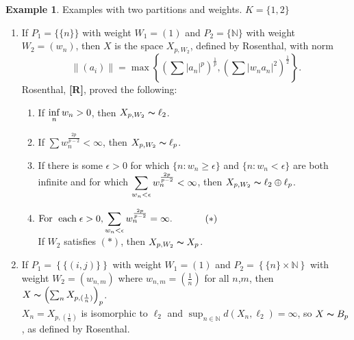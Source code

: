 \documentclass[12pt]{amsart}
\theoremstyle{definition}
\newtheorem{example}[theorem]{Example}
\theoremstyle{remark}
\numberwithin{equation}{section}
\begin{document}
\begin{example}\label{R-space}
 Examples with two partitions and weights.
 $K=\{1,2\}$
  \begin{enumerate}
    \item If $P_1=\big\{ \{n\} \big\}$ with weight $W_1=(1)$ and
 $P_2=\{{\mathbb{N}}\}$ with weight $W_2=(w_n)$, then $X$ is the
 space $X_{p, W_2}$, defined by Rosenthal, with norm
 $$\| (a_i)\|=\max \left\{ \left(\sum |a_n|^p\right)^{\frac{1}{p}}, 
\left(\sum |w_na_n|^2\right)^{\frac{1}{2}}\right\}.$$
  Rosenthal, {\bf{[R]}}, 
proved the following:
          \begin{enumerate}
          \item If $\begin{displaystyle}\inf_n w_n > 0
 \end{displaystyle}$,
 then $X_{p,W_2}\thicksim \ell_2$.
          \item If $\sum w_{n}^{\frac{2p}{p-2}} < \infty$,
 then $X_{p,W_2}\thicksim \ell_p$.
          \item If there is some $\epsilon >0 $ for which
 $\{n: w_n \ge \epsilon\}$ and
  $\{n: w_n < \epsilon\}$ are both infinite and for which
 $\begin{displaystyle}\sum_{w_n <\epsilon} w_{n}^{\frac{2p}{p-2}} < 
\infty\end{displaystyle}$,
 then $X_{p,W_2} \thicksim \ell_2 \oplus \ell_p$.
          \item $\text{For}\;\text{ each}\;\epsilon > 0, 
\begin{displaystyle}\sum_{w_n< \epsilon}
  w_{n}^{\frac{2p}{p-2}}=\infty.\end{displaystyle}\phantom{xxxxxx}(*)$\\
If $W_2$ satisfies $(*)$, then $X_{p,W_2} \thicksim X_p$.
          \end{enumerate}

   
     \item  If $P_1=\left\{ \{(i,j)\} \right\}$ with weight $W_1=(1)$
 and
 $P_2=\left\{ \{n\}\times\mathbb{N}\right\}$ with weight
 $W_2=(w_{n,m})$ where
 $w_{n,m}=\left(\frac{1}{n}\right)$ 
for all $n$,$m$, 
 then $X\thicksim \left(\sum_n X_{p, (\frac{1}{n})}\right)_p$.\\ 
 $X_n = X_{p,(\frac{1}{n})}$ is isomorphic to $\ell_2$ and
 $\sup_{n\in \mathbb{N}} d(X_n, \ell_2) = \infty$, so 
 $X \thicksim B_p$, as defined by Rosenthal.
    \end{enumerate}
\end{example}
\end{document}
